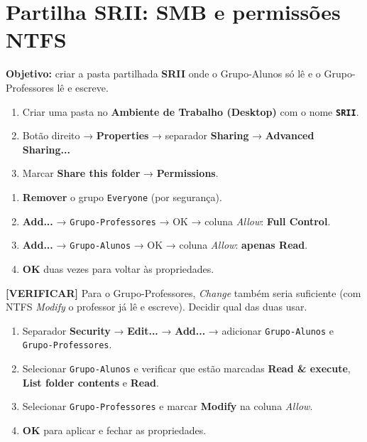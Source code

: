 
\section[Partilha SRII: SMB e permissões NTFS]{Partilha SRII: SMB e permissões NTFS}


\textbf{Objetivo:} criar a pasta partilhada \textbf{SRII} onde o Grupo-Alunos só lê e o Grupo-Professores lê e escreve.


\begin{enumerate}
\item Criar uma pasta no \textbf{Ambiente de Trabalho (Desktop)} com o nome \textbf{\texttt{SRII}}.
\item Botão direito → \textbf{Properties} → separador \textbf{Sharing} → \textbf{Advanced Sharing...}
\item Marcar \textbf{Share this folder} → \textbf{Permissions}.
\end{enumerate}


\begin{enumerate}
\item \textbf{Remover} o grupo \texttt{Everyone} (por segurança).
\item \textbf{Add...} → \texttt{Grupo-Professores} → OK → coluna \emph{Allow}: \textbf{Full Control}.
\item \textbf{Add...} → \texttt{Grupo-Alunos} → OK → coluna \emph{Allow}: \textbf{apenas Read}.
\item \textbf{OK} duas vezes para voltar às propriedades.
\end{enumerate}

\begin{simplesbox}
\textbf{[VERIFICAR]} Para o Grupo-Professores, \emph{Change} também seria suficiente (com NTFS \emph{Modify} o professor já lê e escreve). Decidir qual das duas usar.
\end{simplesbox}


\begin{enumerate}
\item Separador \textbf{Security} → \textbf{Edit...} → \textbf{Add...} → adicionar \texttt{Grupo-Alunos} e \texttt{Grupo-Professores}.
\item Selecionar \texttt{Grupo-Alunos} e verificar que estão marcadas \textbf{Read \& execute}, \textbf{List folder contents} e \textbf{Read}.
\item Selecionar \texttt{Grupo-Professores} e marcar \textbf{Modify} na coluna \emph{Allow}.
\item \textbf{OK} para aplicar e fechar as propriedades.
\end{enumerate}

